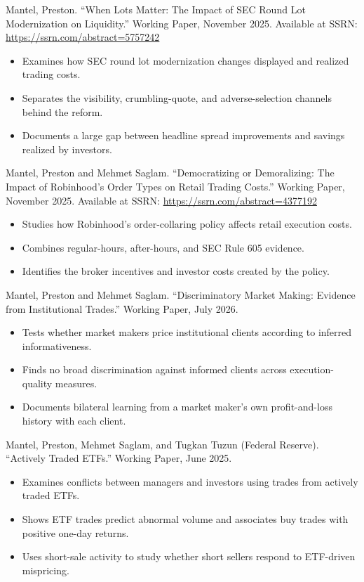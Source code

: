 \documentclass[11pt]{article}
\begin{document}
Mantel, Preston. ``When Lots Matter: The Impact of SEC Round Lot Modernization on Liquidity.'' Working Paper, November 2025. Available at SSRN: \url{https://ssrn.com/abstract=5757242}
\begin{itemize}
  \item Examines how SEC round lot modernization changes displayed and realized trading costs.
  \item Separates the visibility, crumbling-quote, and adverse-selection channels behind the reform.
  \item Documents a large gap between headline spread improvements and savings realized by investors.
\end{itemize}

Mantel, Preston and Mehmet Saglam. ``Democratizing or Demoralizing: The Impact of Robinhood's Order Types on Retail Trading Costs.'' Working Paper, November 2025. Available at SSRN: \url{https://ssrn.com/abstract=4377192}
\begin{itemize}
  \item Studies how Robinhood's order-collaring policy affects retail execution costs.
  \item Combines regular-hours, after-hours, and SEC Rule 605 evidence.
  \item Identifies the broker incentives and investor costs created by the policy.
\end{itemize}

Mantel, Preston and Mehmet Saglam. ``Discriminatory Market Making: Evidence from Institutional Trades.'' Working Paper, July 2026.
\begin{itemize}
  \item Tests whether market makers price institutional clients according to inferred informativeness.
  \item Finds no broad discrimination against informed clients across execution-quality measures.
  \item Documents bilateral learning from a market maker's own profit-and-loss history with each client.
\end{itemize}

\begin{samepage}
Mantel, Preston, Mehmet Saglam, and Tugkan Tuzun (Federal Reserve). ``Actively Traded ETFs.'' Working Paper, June 2025.
\begin{itemize}
  \item Examines conflicts between managers and investors using trades from actively traded ETFs.
  \item Shows ETF trades predict abnormal volume and associates buy trades with positive one-day returns.
  \item Uses short-sale activity to study whether short sellers respond to ETF-driven mispricing.
\end{itemize}
\end{samepage}
\end{document}
